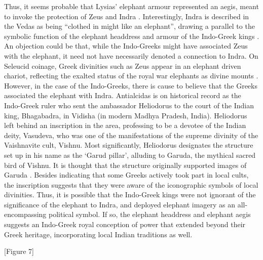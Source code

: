\documentclass{ijsra}
\begin{document}
Thus, it seems probable that Lysias’ elephant armour represented an aegis, meant to invoke the protection of Zeus and Indra \parencite[71]{Whitehead1970}.
Interestingly, Indra is described in the Vedas as being “clothed in might like an elephant”, drawing a parallel to
the symbolic function of the elephant headdress and armour of the Indo-Greek kings \parencite[22]{Gupta1983}. 
An objection could be that, while the Indo-Greeks might have associated Zeus with the elephant,
it need not have necessarily denoted a connection to Indra. 
On Seleucid coinage, Greek divinities such as Zeus appear in an elephant driven chariot,
reflecting the exalted status of the royal war elephants as divine mounts \parencite[254--270]{Alonso2013}. 
However, in the case of the Indo-Greeks, there is cause to believe that the Greeks associated the elephant with Indra. 
Antialcidas is on historical record as the Indo-Greek ruler who sent the ambassador Heliodorus to the court of the Indian king,
Bhagabadra, in Vidisha (in modern Madhya Pradesh, India). 
Heliodorus left behind an inscription in the area, professing to be a devotee of the Indian deity, Vasudeva,
who was one of the manifestations of the supreme divinity of the Vaishnavite cult, Vishnu.
Most significantly, Heliodorus designates the structure set up in his name as the ‘Garud pillar’,
alluding to Garuda, the mythical sacred bird of Vishnu. 
It is thought that the structure originally supported images of Garuda \parencite[126--127]{Mairs2014}. 
Besides indicating that some Greeks actively took part in local cults, the inscription suggests that they were aware of
the iconographic symbols of local divinities. 
Thus, it is possible that the Indo-Greek kings were not ignorant of the significance of the elephant to Indra,
and deployed elephant imagery as an all-encompassing political symbol. 
If so, the elephant headdress and elephant aegis suggests an Indo-Greek royal conception of power that extended beyond
their Greek heritage, incorporating local Indian traditions as well.

[Figure 7]
\end{document}
